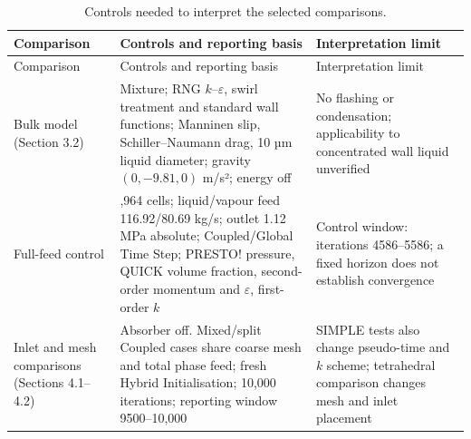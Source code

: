 \documentclass[12pt]{article}
\begin{document}
\begingroup\small\setlength{\tabcolsep}{3pt}
{
\renewcommand{\thetable}{A1b}
\begin{longtable}[]{@{}
  >{\raggedright\arraybackslash}p{}
  >{\raggedright\arraybackslash}p{}
  >{\raggedright\arraybackslash}p{}@{}}
\caption{Controls needed to interpret the selected comparisons.}\label{tab:A1b}\tabularnewline
\toprule\noalign{}
\begin{minipage}[b]{\linewidth}\raggedright
Comparison
\end{minipage} & \begin{minipage}[b]{\linewidth}\raggedright
Controls and reporting basis
\end{minipage} & \begin{minipage}[b]{\linewidth}\raggedright
Interpretation limit
\end{minipage} \\
\midrule\noalign{}
\endfirsthead
\toprule\noalign{}
\begin{minipage}[b]{\linewidth}\raggedright
Comparison
\end{minipage} & \begin{minipage}[b]{\linewidth}\raggedright
Controls and reporting basis
\end{minipage} & \begin{minipage}[b]{\linewidth}\raggedright
Interpretation limit
\end{minipage} \\
\midrule\noalign{}
\endhead
\bottomrule\noalign{}
\endlastfoot
Bulk model (Section 3.2) & Mixture; RNG \(k\)--\(\varepsilon\), swirl treatment and standard wall functions; Manninen slip, Schiller--Naumann drag, 10 µm liquid diameter; gravity \((0,-9.81,0)\) m/s²; energy off & No flashing or condensation; applicability to concentrated wall liquid unverified \\
Full-feed control & 60,964 cells; liquid/vapour feed 116.92/80.69 kg/s; outlet 1.12 MPa absolute; Coupled/Global Time Step; PRESTO! pressure, QUICK volume fraction, second-order momentum and \(\varepsilon\), first-order \(k\) & Control window: iterations 4586--5586; a fixed horizon does not establish convergence \\
Inlet and mesh comparisons (Sections 4.1--4.2) & Absorber off. Mixed/split Coupled cases share coarse mesh and total phase feed; fresh Hybrid Initialisation; 10,000 iterations; reporting window 9500--10,000 & SIMPLE tests also change pseudo-time and \(k\) scheme; tetrahedral comparison changes mesh and inlet placement \\

\end{longtable}}
\end{document}
